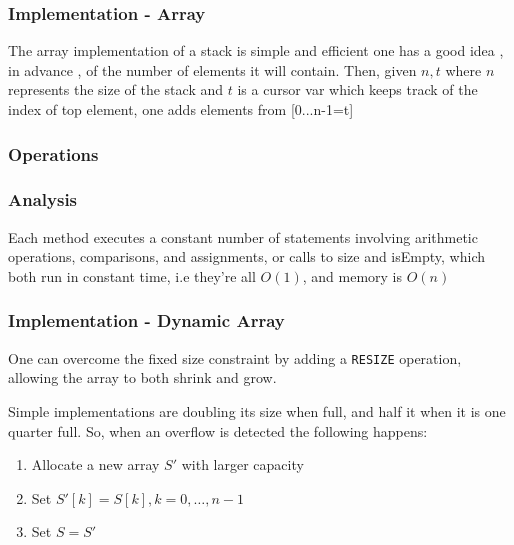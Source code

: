		\subsubsection{Implementation - Array}

				\par{The array implementation of a stack is simple and efficient  one has a good idea , in advance , of the number of elements it will contain. Then, given $n,t$ where $n$ represents the size of the stack and $t$ is a cursor var which keeps track of the index of top element, one adds elements from [0...n-1=t]}



		\subsubsection{Operations}

		\subsubsection{Analysis}

				\par{Each method executes a constant number of statements involving
arithmetic operations, comparisons, and assignments, or calls to size and isEmpty,
which both run in constant time, i.e they're all $O(1)$, and memory is $O(n)$}

		\subsubsection{Implementation - Dynamic Array}

				\par{One can overcome the fixed size constraint by adding a \texttt{RESIZE} operation, allowing the array to both shrink and grow.}
				\par{Simple implementations are doubling its size when full, and half it when it is one quarter full. So, when an overflow is detected the following happens:}
				\begin{enumerate}
						\item Allocate a new array $S'$ with larger capacity
						\item Set $S'[k] = S[k] , k = 0 , \dots , n-1$
						\item Set $S = S'$
				\end{enumerate}

